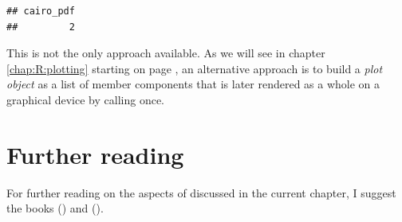\documentclass[krantz2]{krantz}\usepackage{knitr}
\begin{document}
\begin{knitrout}\footnotesize
{}\color{fgcolor}\begin{kframe}
\begin{alltt}
\hlstd{(} \hlstd{=} \hlstd{,}  \hlstd{=} \hlstd{,}  \hlstd{=} \hlstd{)}
 \hlopt{~}   
\hlstd{(} \hlstd{=} \hlstd{,}  \hlstd{=} \hlstd{,}  \hlstd{=} \hlstd{)}
\hlstd{()}
\end{alltt}
\begin{verbatim}
## cairo_pdf 
##         2
\end{verbatim}
\end{kframe}
\end{knitrout}

\begin{infobox}
This is not the only approach available. As we will see in chapter \ref{chap:R:plotting} starting on page \pageref{chap:R:plotting}, an alternative approach is to build a \emph{plot object} as a list of member components that is later rendered as a whole on a graphical device by calling  once.
\end{infobox}

\section{Further reading}
For further reading on the aspects of \Rlang discussed in the current chapter,
 I suggest the books  (\citeauthor{Peng2016}) and  (\citeauthor{Matloff2011}).



















\backmatter

\printbibliography

\printindex\label{idx:general}

\printindex[rcatsidx]\label{idx:rcats}

\printindex[rindex]\label{idx:rindex}
\end{document}
